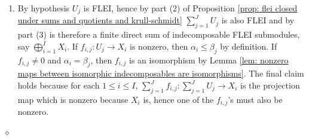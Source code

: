 \documentclass{article}
\newenvironment{proof}{\vspace*{2ex}\noindent {\em Proof:}
}{\hfill $\diamond$ \\[2ex]}
\begin{document}
\begin{proof}

\begin{enumerate}
    \item By hypothesis $U_j$ is FLEI, hence by part (2) of Proposition \ref{prop: flei closed under sums and quotients and krull-schmidt} $\sum_{j = 1}^J U_j$ is also FLEI and by part (3) is therefore a finite direct sum of indecomposable FLEI submodules, say $\bigoplus_{i = 1}^I X_i$. If $f_{i,j} : U_j \to X_i$ is nonzero, then $\alpha_i \leq \beta_j$ by definition. If $f_{i,j} \neq 0$ and $\alpha_i = \beta_j$, then $f_{i , j}$ is an isomorphism by Lemma \ref{lem: nonzero maps between isomorphic indecomposables are isomorphisms}. The final claim holds because for each $1 \leq i \leq I$, $\sum_{j = 1}^J f_{i , j} : \sum_{j = 1}^J U_j \to X_i$ is the projection map which is nonzero because $X_i$ is, hence one of the $f_{i , j}$'s must also be nonzero. 


\end{enumerate}
\end{proof}
\end{document}
